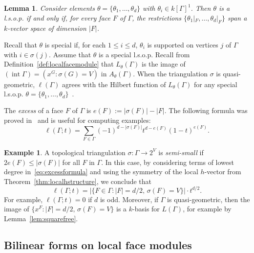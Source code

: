 \documentclass[11pt]{article}
\newtheorem{lemm}[theo]{Lemma}
\theoremstyle{definition}
\newtheorem{example}[theo]{Example}
\numberwithin{equation}{section}
\numberwithin{equation}{section}
\begin{document}
\begin{lemm}\label{lem:Stanleycriterion}\cite[Lemma III.2.4]{Stanleybook}
	Consider elements $ \theta = \{ \theta_1,\ldots,\theta_d \}$ with $\theta_i \in k[\Gamma]^1$. Then $\theta$ is a l.s.o.p. if and only if, for every face $F$ of $\Gamma$, the restrictions $\{ \theta_1|_F,\ldots,\theta_d|_F \}$ span a $k$-vector space of dimension $|F|$. 
\end{lemm}

Recall  that $\theta$ is special if, for each $1 \le i \le d$, $\theta_i$ is supported on vertices $j$ of $\Gamma$ with $i \in \sigma(j)$. Assume that $\theta$ is a special l.s.o.p. Recall from Definition~\ref{def:localfacemodule} that $L_\theta(\Gamma)$ is the image of $(\operatorname{int} \Gamma) = (x^G : \sigma(G) = V)$ in
$A_{\theta}(\Gamma)$. 
When the triangulation $\sigma$ is quasi-geometric, $\ell(\Gamma)$ agrees with the Hilbert function of $L_{\theta}(\Gamma)$ for any special l.s.o.p. $\theta = \{ \theta_1, \dotsc, \theta_d \}$~\cite[Theorem 4.6]{Stanleylocalh}. 

The \emph{excess}  of a face $F$ of $\Gamma$ is $e(F) := |\sigma(F)| - |F|$. 
The following formula was proved in~\cite[Proposition~2.2]{Stanleylocalh} and is useful for computing examples:
\begin{equation}\label{eq:excessformula}
	\ell(\Gamma;t) = \sum_{F \in \Gamma} (-1)^{d - |\sigma(F)|} t^{d - e(F)} (1 - t)^{e(F)}. 
\end{equation}

\begin{example}\label{ex:semismall}
	A topological triangulation $\sigma \colon \Gamma \to 2^V$ is \emph{semi-small} if
	$2e(F) \le |\sigma(F)|$ for all $F$ in $\Gamma$. In this case, by considering terms of lowest degree in~\eqref{eq:excessformula} and using the symmetry of the local $h$-vector from Theorem~\ref{thm:localhstructure}, we conclude that 
	\[\ell(\Gamma;t) = |\{ F \in \Gamma : |F| = d/2, \, \sigma(F) = V\}| \cdot t^{d/2}.\]
For example,  $\ell(\Gamma; t) = 0$ if $d$ is odd.
	Moreover, if $\Gamma$ is quasi-geometric, then the image of $\{ x^F : |F| = d/2, \, \sigma(F) = V \}$ is a $k$-basis for $L(\Gamma)$, for example by Lemma~\ref{lem:squarefree}. 
\end{example}

\subsection{Bilinear forms on local face modules}\label{ssec:bilinear}
\end{document}
